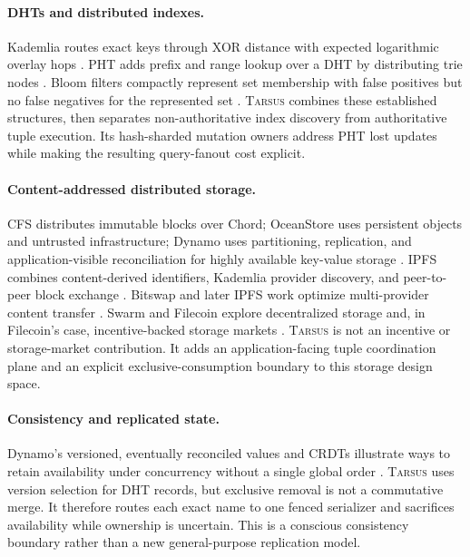 \documentclass[conference]{IEEEtran}
\newcommand{\system}{\textsc{Tarsus}\xspace}
\begin{document}
\paragraph{DHTs and distributed indexes.}
Kademlia routes exact keys through XOR distance with expected logarithmic
overlay hops \cite{MaymounkovKademlia}. PHT adds prefix and range lookup over a
DHT by distributing trie nodes \cite{RamabhadranPHT}. Bloom filters compactly
represent set membership with false positives but no false negatives for the
represented set \cite{Bloom1970}. \system combines these established
structures, then separates non-authoritative index discovery from
authoritative tuple execution. Its hash-sharded mutation owners address PHT
lost updates while making the resulting query-fanout cost explicit.

\paragraph{Content-addressed distributed storage.}
CFS distributes immutable blocks over Chord; OceanStore uses persistent
objects and untrusted infrastructure; Dynamo uses partitioning, replication,
and application-visible reconciliation for highly available key-value storage
\cite{DabekCFS,KubiatowiczOceanStore,DeCandiaDynamo}. IPFS combines
content-derived identifiers, Kademlia provider discovery, and peer-to-peer
block exchange \cite{Trautwein2022}. Bitswap and later IPFS work optimize
multi-provider content transfer \cite{deLaRochaBitswap}. Swarm and Filecoin
explore decentralized storage and, in Filecoin's case, incentive-backed
storage markets \cite{SwarmWhitepaper,FilecoinWhitepaper}. \system is not an
incentive or storage-market contribution. It adds an application-facing tuple
coordination plane and an explicit exclusive-consumption boundary to this
storage design space.

\paragraph{Consistency and replicated state.}
Dynamo's versioned, eventually reconciled values and CRDTs illustrate ways to
retain availability under concurrency without a single global order
\cite{DeCandiaDynamo,ShapiroCRDT}. \system uses version selection for DHT
records, but exclusive removal is not a commutative merge. It therefore routes
each exact name to one fenced serializer and sacrifices availability while
ownership is uncertain. This is a conscious consistency boundary rather than
a new general-purpose replication model.
\end{document}
